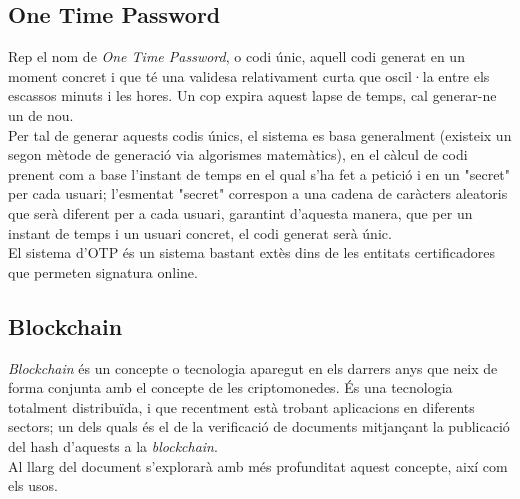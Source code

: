 \subsection{One Time Password}
Rep el nom de \textit{One Time Password}, o codi únic, aquell codi generat en un moment concret i que té una validesa relativament curta que oscil·la entre els escassos minuts i les hores. Un cop expira aquest lapse de temps, cal generar-ne un de nou.\\
\newline Per tal de generar aquests codis únics, el sistema es basa generalment  (existeix un segon mètode de generació via algorismes matemàtics), en el càlcul de codi prenent com a base l'instant de temps en el qual s'ha fet a petició i en un "secret" per cada usuari; l'esmentat "secret" correspon a una cadena de caràcters aleatoris que serà diferent per a cada usuari, garantint d'aquesta manera, que per un instant de temps i un usuari concret, el codi generat serà únic.\\
\newline El sistema d'OTP és un sistema bastant extès dins de les entitats certificadores que permeten signatura online.

\subsection{Blockchain}
\textit{Blockchain} és un concepte o tecnologia aparegut en els darrers anys que neix de forma conjunta amb el concepte de les criptomonedes.
És una tecnologia totalment distribuïda, i que recentment està trobant aplicacions en diferents sectors; un dels quals és el de la verificació de documents mitjançant la publicació del hash d'aquests a la \textit{blockchain}.\\
\newline Al llarg del document s'explorarà amb més profunditat aquest concepte, així com els usos.